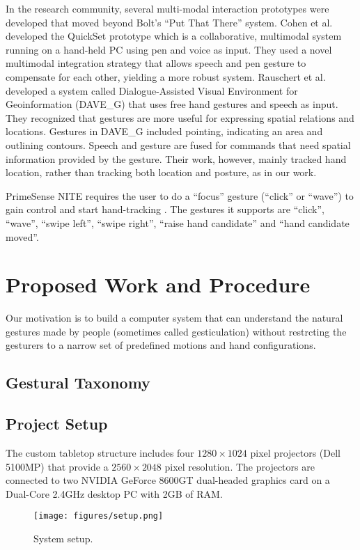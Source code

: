 In the research community, several multi-modal interaction prototypes were developed that moved beyond Bolt's ``Put That There'' system. Cohen et al. \cite{Cohen97} developed the QuickSet prototype which is a collaborative, multimodal system running on a hand-held PC using pen and voice as input. They used a novel multimodal integration strategy that allows speech and pen gesture to compensate for each other, yielding a more robust system. Rauschert et al. \cite{Rauschert02} developed a system called Dialogue-Assisted Visual Environment for Geoinformation (DAVE\_G) that uses free hand gestures and speech as input. They recognized that gestures are more useful for expressing spatial relations and locations. Gestures in DAVE\_G included pointing, indicating an area and outlining contours. Speech and gesture are fused for commands that need spatial information provided by the gesture. Their work, however, mainly tracked hand location, rather than tracking both location and posture, as in our work.

PrimeSense NITE requires the user to do a ``focus'' gesture (``click'' or
``wave'') to gain control and start hand-tracking \cite{primesense-manual}. The
gestures it supports are ``click'', ``wave'', ``swipe left'', ``swipe right'',
``raise hand candidate'' and ``hand candidate moved''.

\section{Proposed Work and Procedure}
Our motivation is to build a computer system that can understand the natural
gestures made by people (sometimes called gesticulation) without restrcting the
gesturers to a narrow set of predefined motions and hand configurations.

\subsection{Gestural Taxonomy}

\subsection{Project Setup}
The custom tabletop structure includes four $1280\times1024$ pixel projectors (Dell 5100MP) that provide a $2560\times2048$ pixel resolution. The projectors are connected to two NVIDIA GeForce 8600GT dual-headed graphics card on a Dual-Core 2.4GHz desktop PC with 2GB of RAM.

\begin{figure}
	\centering
	\texttt{[image: figures/setup.png]} 
	\caption{System setup.} \label{fig:setup}
\end{figure}

